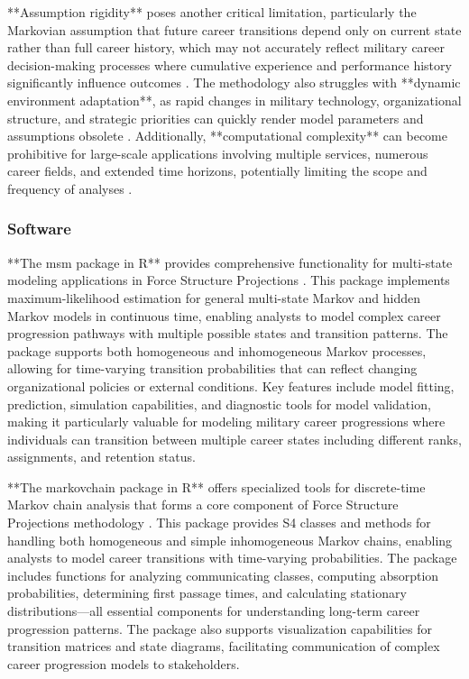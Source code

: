 \documentclass[main.tex]{subfiles}
\begin{document}
**Assumption rigidity** poses another critical limitation, particularly the Markovian assumption that future career transitions depend only on current state rather than full career history, which may not accurately reflect military career decision-making processes where cumulative experience and performance history significantly influence outcomes \parencite{markov_career_progression}. The methodology also struggles with **dynamic environment adaptation**, as rapid changes in military technology, organizational structure, and strategic priorities can quickly render model parameters and assumptions obsolete \parencite{air_force_career}. Additionally, **computational complexity** can become prohibitive for large-scale applications involving multiple services, numerous career fields, and extended time horizons, potentially limiting the scope and frequency of analyses \parencite{eisler_allen}.

\subsubsection{Software}

**The msm package in R** provides comprehensive functionality for multi-state modeling applications in Force Structure Projections \parencite{msm_package}. This package implements maximum-likelihood estimation for general multi-state Markov and hidden Markov models in continuous time, enabling analysts to model complex career progression pathways with multiple possible states and transition patterns. The package supports both homogeneous and inhomogeneous Markov processes, allowing for time-varying transition probabilities that can reflect changing organizational policies or external conditions. Key features include model fitting, prediction, simulation capabilities, and diagnostic tools for model validation, making it particularly valuable for modeling military career progressions where individuals can transition between multiple career states including different ranks, assignments, and retention status.

**The markovchain package in R** offers specialized tools for discrete-time Markov chain analysis that forms a core component of Force Structure Projections methodology \parencite{markovchain_package}. This package provides S4 classes and methods for handling both homogeneous and simple inhomogeneous Markov chains, enabling analysts to model career transitions with time-varying probabilities. The package includes functions for analyzing communicating classes, computing absorption probabilities, determining first passage times, and calculating stationary distributions—all essential components for understanding long-term career progression patterns. The package also supports visualization capabilities for transition matrices and state diagrams, facilitating communication of complex career progression models to stakeholders.
\end{document}
